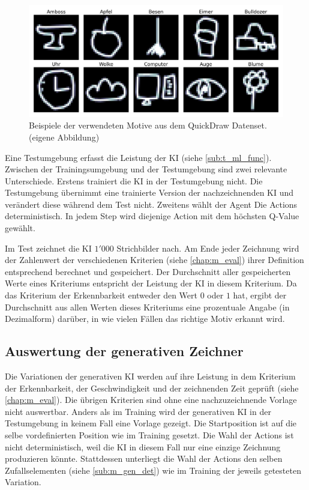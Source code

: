 \begin{figure}[!ht]
    \centering
    \includegraphics[width=\textwidth]{images/methode/quickdraw-examples.png}
    \caption{Beispiele der verwendeten Motive aus dem QuickDraw Datenset. (eigene Abbildung)}\label{fig:quickdraw-examples}
\end{figure}

Eine Testumgebung erfasst die Leistung der KI (siehe \ref{sub:t_ml_func}).
Zwischen der Trainingsumgebung und der Testumgebung sind zwei relevante
Unterschiede. Erstens trainiert die KI in der Testumgebung nicht. Die
Testumgebung übernimmt eine trainierte Version der nachzeichnenden KI und
verändert diese während dem Test nicht. Zweitens wählt der Agent Die Actions
deterministisch. In jedem Step wird diejenige Action mit dem höchsten Q-Value
gewählt.

Im Test zeichnet die KI $1'000$ Strichbilder nach. Am Ende jeder Zeichnung wird
der Zahlenwert der verschiedenen Kriterien (siehe \ref{chap:m_eval}) ihrer
Definition entsprechend berechnet und gespeichert. Der Durchschnitt aller
gespeicherten Werte eines Kriteriums entspricht der Leistung der KI in diesem
Kriterium. Da das Kriterium der Erkennbarkeit entweder den Wert $0$ oder $1$
hat, ergibt der Durchschnitt aus allen Werten dieses Kriteriums eine prozentuale
Angabe (in Dezimalform) darüber, in wie vielen Fällen das richtige Motiv erkannt
wird.

\subsection{Auswertung der generativen Zeichner}\label{sub:m_auswert_gen}

Die Variationen der generativen KI werden auf ihre Leistung in dem Kriterium der
Erkennbarkeit, der Geschwindigkeit und der zeichnenden Zeit geprüft (siehe
\ref{chap:m_eval}). Die übrigen Kriterien sind ohne eine
nachzuzeichnende Vorlage nicht auswertbar. Anders als im Training wird der
generativen KI in der Testumgebung in keinem Fall eine Vorlage gezeigt. Die
Startposition ist auf die selbe vordefinierten Position wie im Training gesetzt.
Die Wahl der Actions ist nicht deterministisch, weil die KI in diesem Fall nur
eine einzige Zeichnung produzieren könnte. Stattdessen unterliegt die Wahl der
Actions den selben Zufallselementen (siehe \ref{sub:m_gen_det}) wie im
Training der jeweils getesteten Variation.

